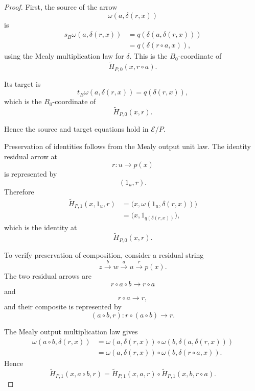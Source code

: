 \begin{proof}
    First, the source of the arrow
    \[
        \omega(a,\delta(r,x))
    \]
    is
    \[
        \begin{aligned}
            s_B\omega(a,\delta(r,x))
            &=
            q(\delta(a,\delta(r,x)))
            \\
            &=
            q(\delta(r\circ a,x)),
        \end{aligned}
    \]
    using the Mealy multiplication law for \(\delta\). This is the
    \(B_0\)-coordinate of
    \[
        \widetilde H_{P,0}(x,r\circ a).
    \]

    Its target is
    \[
        t_B\omega(a,\delta(r,x))
        =
        q(\delta(r,x)),
    \]
    which is the \(B_0\)-coordinate of
    \[
        \widetilde H_{P,0}(x,r).
    \]

    Hence the source and target equations hold in \(\mathcal E/P\).

    Preservation of identities follows from the Mealy output unit law. The
    identity residual arrow at
    \[
        r:u\to p(x)
    \]
    is represented by
    \[
        (1_u,r).
    \]
    Therefore
    \[
        \begin{aligned}
            \widetilde H_{P,1}(x,1_u,r)
            &=
            \bigl(
                x,
                \omega(1_u,\delta(r,x))
            \bigr)
            \\
            &=
            \bigl(
                x,
                1_{q(\delta(r,x))}
            \bigr),
        \end{aligned}
    \]
    which is the identity at
    \[
        \widetilde H_{P,0}(x,r).
    \]

    To verify preservation of composition, consider a residual string
    \[
        z\xrightarrow{b}w\xrightarrow{a}u
        \xrightarrow{r}p(x).
    \]
    The two residual arrows are
    \[
        r\circ a\circ b\longrightarrow r\circ a
    \]
    and
    \[
        r\circ a\longrightarrow r,
    \]
    and their composite is represented by
    \[
        (a\circ b,r):
        r\circ(a\circ b)\longrightarrow r.
    \]

    The Mealy output multiplication law gives
    \[
        \begin{aligned}
            \omega(a\circ b,\delta(r,x))
            &=
            \omega(a,\delta(r,x))
            \circ
            \omega(b,\delta(a,\delta(r,x)))
            \\
            &=
            \omega(a,\delta(r,x))
            \circ
            \omega(b,\delta(r\circ a,x)).
        \end{aligned}
    \]
    Hence
    \[
        \widetilde H_{P,1}(x,a\circ b,r)
        =
        \widetilde H_{P,1}(x,a,r)
        \circ
        \widetilde H_{P,1}(x,b,r\circ a).
    \]


\end{proof}

